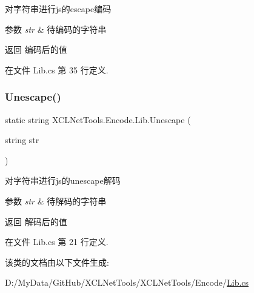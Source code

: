 对字符串进行js的escape编码 


\begin{DoxyParams}{参数}
{\em str} & 待编码的字符串\\
\hline
\end{DoxyParams}
\begin{DoxyReturn}{返回}
编码后的值
\end{DoxyReturn}


在文件 Lib.\+cs 第 35 行定义.

\mbox{\label{class_x_c_l_net_tools_1_1_encode_1_1_lib_a3820bb303f5c96fa7e802f4cd0ac9ece}} 
\subsubsection{\texorpdfstring{Unescape()}{Unescape()}}
{\footnotesize\ttfamily static string X\+C\+L\+Net\+Tools.\+Encode.\+Lib.\+Unescape (\begin{DoxyParamCaption}\item[{string}]{str }\end{DoxyParamCaption})\hspace{0.3cm}{\ttfamily [static]}}



对字符串进行js的unescape解码 


\begin{DoxyParams}{参数}
{\em str} & 待解码的字符串\\
\hline
\end{DoxyParams}
\begin{DoxyReturn}{返回}
解码后的值
\end{DoxyReturn}


在文件 Lib.\+cs 第 21 行定义.



该类的文档由以下文件生成\+:\begin{DoxyCompactItemize}
\item 
D\+:/\+My\+Data/\+Git\+Hub/\+X\+C\+L\+Net\+Tools/\+X\+C\+L\+Net\+Tools/\+Encode/\hyperlink{_encode_2_lib_8cs}{Lib.\+cs}\end{DoxyCompactItemize}
